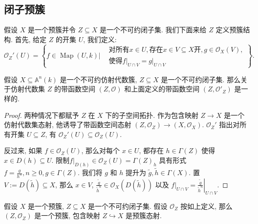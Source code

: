 \subsection{闭子预簇}

假设 \( X \) 是一个预簇并令 \( Z \subseteq X \) 是一个不可约闭子集. 我们下面来给
\( Z \) 定义预簇结构. 首先, 给定 \( Z \) 的开集 \( U \), 我们定义:
\[
  \mathscr{O}_{Z}'(U) = \left\lbrace f \in \operatorname{Map}(U, k) \bigg\vert
    \begin{aligned}
    &\text{对所有} x \in U, \text{存在} x \in V \subseteq X \text{开}, g \in
      \mathscr{O}_{X}(V),\\ &\text{使得} \left. f \right\vert_{U \cap V} =
        \left. g \right\vert_{U \cap V}
    \end{aligned}
    \right\rbrace.
\]

\begin{lemma}
  假设 \( X \subseteq \mathbb{A}^n(k) \) 是一个不可约仿射代数簇, \( Z \subseteq
  X\) 是一个不可约闭子集. 那么关于仿射代数集 \( Z \) 的带函数空间 \( (Z,
  \mathscr{O}) \) 和上面定义的带函数空间 \( (Z, \mathscr{O}'_Z) \) 是一样的.
\end{lemma}
\begin{proof}
  两种情况下都赋予 \( Z \) 在 \( X \) 下的子空间拓扑. 作为包含映射 \( Z \to X \)
  是一个仿射代数集态射, 他诱导了带函数空间态射 \( (Z, \mathscr{O}_Z) \to (X,
  \mathscr{O}_X) \). \( \mathscr{O}_Z' \) 指出对所有开集 \( U \subseteq Z \),
  有 \( \mathscr{O}_Z'(U) \subseteq \mathscr{O}_Z(U) \).

  反过来, 如果 \( f \in \mathscr{O}_Z(U) \), 那么对每个 \( x \in U \), 都存在 \(
  h \in \Gamma(Z) \) 使得 \( x \in D(h) \subseteq U \). 限制\( \left.
    f \right\vert_{D(h)} \in \mathscr{O}_Z(U) = \Gamma(Z)_h \) 具有形式 \( f =
    \frac{g}{h^n}, n \geq 0, g \in \Gamma(Z) \). 我们将 \( g \) 和 \( h \)
    提升为 \( \widetilde{g}, \widetilde{h} \in \Gamma(X) \). 置 \( V :=
    D(\widetilde{h}) \subseteq X \), 那么 \( x \in V \), \(
    \frac{\widetilde{g}}{\widetilde{h}^n} \in \mathscr{O}_X(D(\widetilde{h})) \)
    以及 \( \left. f \right\vert_{U \cap V} =
      \left. \frac{\widetilde{g}}{\widetilde{h}^n} \right\vert_{U \cap V} \).
\end{proof}

\begin{proposition}
  假设 \( X \) 是一个预簇, \( Z \subseteq X \) 是一个不可约闭子集. 假设 \(
  \mathscr{O}_Z \) 按如上定义, 那么 \( (Z, \mathscr{O}_Z) \) 是一个预簇,
  包含映射 \( Z \hookrightarrow X \) 是预簇态射.
\end{proposition}

